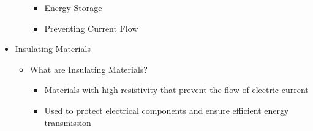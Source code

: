 \begin{itemize}
\begin{itemize}
        \begin{itemize}

          \item Energy Storage

          \item Preventing Current Flow

        \end{itemize}

    \end{itemize}
    
  \item Insulating Materials

    \begin{itemize}

      \item What are Insulating Materials?

        \begin{itemize}

          \item Materials with high resistivity that prevent the flow of electric current

          \item Used to protect electrical components and ensure efficient energy transmission

        \end{itemize}

    \end{itemize}

\end{itemize}



